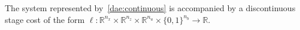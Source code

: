 The system represented by~\eqref{dae:continuous} is accompanied by a discontinuous stage cost of the form $\ell:\mathbb{R}^{n_x}\times\mathbb{R}^{n_z}\times\mathbb{R}^{n_u}\times\{0,1\}^{n_b}\to\mathbb{R}$.

